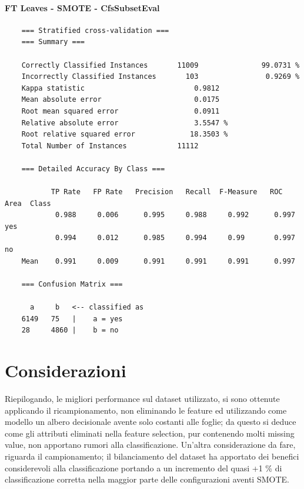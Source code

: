 \paragraph{FT Leaves - SMOTE - CfsSubsetEval}
{\footnotesize
	\begin{verbatim}
	=== Stratified cross-validation ===
	=== Summary ===
	
	Correctly Classified Instances       11009               99.0731 %
	Incorrectly Classified Instances       103                0.9269 %
	Kappa statistic                          0.9812
	Mean absolute error                      0.0175
	Root mean squared error                  0.0911
	Relative absolute error                  3.5547 %
	Root relative squared error             18.3503 %
	Total Number of Instances            11112     
	
	=== Detailed Accuracy By Class ===
	
	       TP Rate   FP Rate   Precision   Recall  F-Measure   ROC Area  Class
	        0.988     0.006      0.995     0.988     0.992      0.997    yes
	        0.994     0.012      0.985     0.994     0.99       0.997    no
	Mean    0.991     0.009      0.991     0.991     0.991      0.997
	
	=== Confusion Matrix ===
	
	  a     b   <-- classified as
	6149   75   |    a = yes
	28     4860 |    b = no	
	\end{verbatim}
}

\section{Considerazioni}
Riepilogando, le migliori performance sul dataset utilizzato, si sono ottenute applicando il ricampionamento, non eliminando le feature ed utilizzando come modello un albero decisionale avente solo costanti alle foglie; da questo si deduce come gli attributi eliminati nella feature selection, pur contenendo molti missing value, non apportano rumori alla classificazione.
Un'altra considerazione da fare, riguarda il campionamento; il bilanciamento del dataset ha apportato dei benefici considerevoli alla classificazione portando a un incremento del quasi +1 \% di classificazione corretta nella maggior parte delle configurazioni aventi SMOTE.

